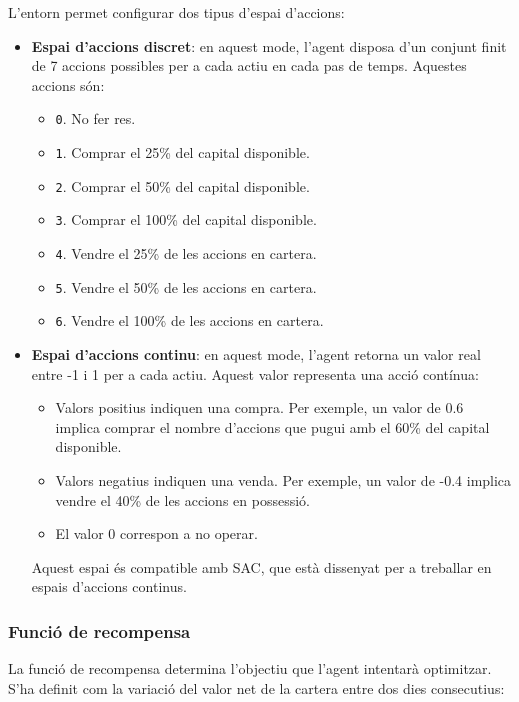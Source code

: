 \documentclass[12pt,a4paper,twoside]{book}
\begin{document}
L'entorn permet configurar dos tipus d'espai d'accions:
\begin{itemize}
    \item \textbf{Espai d'accions discret}: en aquest mode, l'agent disposa d'un conjunt finit de 7 accions possibles per a cada actiu en cada pas de temps. Aquestes accions són:
    \begin{itemize}
        \item \texttt{0}. No fer res.
        \item \texttt{1}. Comprar el 25\% del capital disponible.
        \item \texttt{2}. Comprar el 50\% del capital disponible.
        \item \texttt{3}. Comprar el 100\% del capital disponible.
        \item \texttt{4}. Vendre el 25\% de les accions en cartera.
        \item \texttt{5}. Vendre el 50\% de les accions en cartera.
        \item \texttt{6}. Vendre el 100\% de les accions en cartera.
    \end{itemize}

    \item \textbf{Espai d'accions continu}: en aquest mode, l'agent retorna un valor real entre -1 i 1 per a cada actiu. Aquest valor representa una acció contínua:
    \begin{itemize}
        \item Valors positius indiquen una compra. Per exemple, un valor de 0.6 implica comprar el nombre d'accions que pugui amb el 60\% del capital disponible.
        \item Valors negatius indiquen una venda. Per exemple, un valor de -0.4 implica vendre el 40\% de les accions en possessió.
        \item El valor 0 correspon a no operar.
    \end{itemize}
    Aquest espai és compatible amb SAC, que està dissenyat per a treballar en espais d'accions continus.
\end{itemize}

\subsubsection{Funció de recompensa}

La funció de recompensa determina l'objectiu que l'agent intentarà optimitzar. S'ha definit com la variació del valor net de la cartera entre dos dies consecutius:
\end{document}
